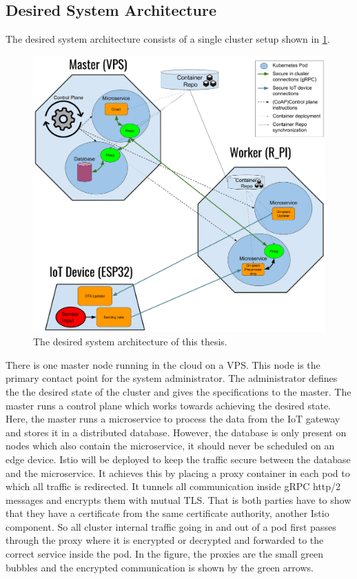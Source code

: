 \subsection{Desired System Architecture} \label{sec:desiredSystem}
The desired system architecture consists of a single cluster setup shown in \cref{fig:implementationSetup}.
\begin{figure}
    \centering
    \includegraphics[scale=0.25]{figures/implementationSetup.png}
    \caption{The desired system architecture of this thesis.}
    \label{fig:implementationSetup}
\end{figure}
There is one master node running in the cloud on a VPS. This node is the primary contact point for the system administrator. The administrator defines the the desired state of the cluster and gives the specifications to the master. The master runs a control plane which works towards achieving the desired state. Here, the master runs a microservice to process the data from the IoT gateway and stores it in a distributed database. However, the database is only present on nodes which also contain the microservice, it should never be scheduled on an edge device. Istio will be deployed to keep the traffic secure between the database and the microservice. It achieves this by placing a proxy container in each pod to which all traffic is redirected. It tunnels all communication inside gRPC http/2 messages and encrypts them with mutual TLS. That is both parties have to show that they have a certificate from the same certificate authority, another Istio component. So all cluster internal traffic going in and out of a pod first passes through the proxy where it is encrypted or decrypted and forwarded to the correct service inside the pod. In the figure, the proxies are the small green bubbles and the encrypted communication is shown by the green arrows.

